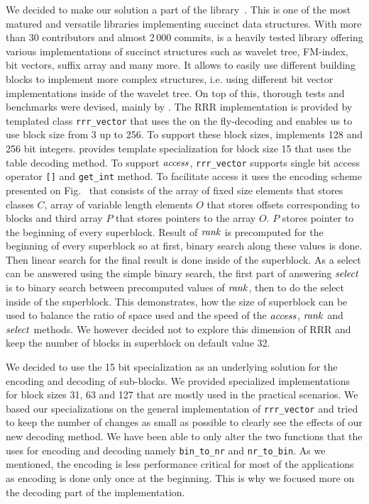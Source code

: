 We decided to make our solution a part of the \sdsl library~\citep{gog2014theory}. This
is one of the most matured and versatile libraries implementing succinct data structures.
With more than 30 contributors and almost 2\,000 commits, \sdsl is a heavily tested library
offering various implementations of succinct structures such as wavelet tree, FM-index,
bit vectors, suffix array and many more. It allows to easily use different building blocks
to implement more complex structures, i.e. using different bit vector implementations inside
of the wavelet tree. On top of this, thorough tests and benchmarks were devised, mainly by
\cite{gog2014optimized}. The RRR implementation is provided by templated class \texttt{rrr\_vector}
that uses the on the fly-decoding and enables us to use block size from 3 up to 256. To support
these block sizes, \sdsl implements 128 and 256 bit integers. \sdsl provides template
specialization for block size 15 that uses the table decoding method. To support $\mathit{access}$,
\texttt{rrr\_vector} supports single bit access operator \texttt{[]} and \texttt{get\_int} method.
To facilitate access it uses the encoding scheme presented on Fig.~\label{obr:RRRFinal} that
consists of the array of fixed size elements that stores classes $C$, array of variable length
elements $O$ that stores offsets corresponding to blocks and third array $P$ that stores pointers
to the array $O$. $P$ stores pointer to the beginning of every superblock. Result of $\mathit{rank}$ is
precomputed for the beginning of every superblock so at first, binary search along these values
is done. Then linear search for the final result is done inside of the superblock. As a select
can be answered using the simple binary search, the first part of answering $\mathit{select}$ is to
binary search between precomputed values of $\mathit{rank}$, then to do the select inside of the superblock.
This demonstrates, how the size of superblock can be used to balance the ratio of space used and the
speed of the $\mathit{access}$, $\mathit{rank}$ and $\mathit{select}$ methods. We however decided not to explore this dimension
of RRR and keep the number of blocks in superblock on default value 32.

We decided to use the 15 bit specialization as an underlying solution for the encoding and decoding of
sub-blocks. We provided specialized implementations for block sizes 31, 63 and 127 that are mostly used
in the practical scenarios. We based our specializations on the general implementation of
\texttt{rrr\_vector} and tried to keep the number of changes as small as possible to clearly see the
effects of our new decoding method. We have been able to only alter the two functions that the \sdsl
uses for encoding and decoding namely \texttt{bin\_to\_nr} and \texttt{nr\_to\_bin}. As we mentioned,
the encoding is less performance critical for most of the applications as encoding is done only once
at the beginning. This is why we focused more on the decoding part of the implementation.

